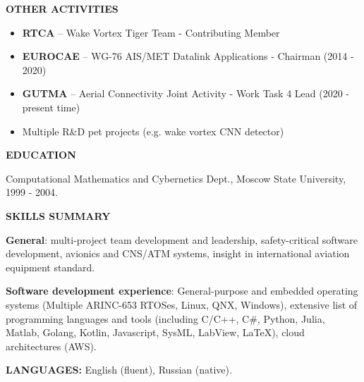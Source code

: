 \documentclass[a4paper]{article}
\begin{document}
    \textbf{OTHER ACTIVITIES}

	\begin{itemize}
	    \item \textbf{RTCA} -- Wake Vortex Tiger Team - Contributing Member
	    \item \textbf{EUROCAE} -- WG-76 AIS/MET Datalink Applications - Chairman (2014 - 2020)
	    \item \textbf{GUTMA} -- Aerial Connectivity Joint Activity - Work Task 4 Lead (2020 - present time)
	    \item Multiple R\&D pet projects (e.g. wake vortex CNN detector)
    \end{itemize}
    \vspace{3mm}
    
    \textbf{EDUCATION}
    \vspace{3mm}
    
    Computational Mathematics and Cybernetics Dept., Moscow State University, 1999 - 2004.
    \vspace{5mm}
    
    \textbf{SKILLS SUMMARY}
    \vspace{3mm}
    
    \textbf{General}: multi-project team development and leadership, safety-critical software development, avionics and CNS/ATM systems, insight in international aviation equipment standard.
    \vspace{3mm}
    
    \textbf{Software development experience}: General-purpose and embedded operating systems (Multiple ARINC-653 RTOSes, Linux, QNX, Windows), extensive list of programming languages and tools (including C/C++, C\#, Python, Julia, Matlab, Golang, Kotlin, Javascript, SysML, LabView, LaTeX), cloud architectures (AWS).
    \vspace{5mm}
    
    \textbf{LANGUAGES:} English (fluent), Russian (native).
\end{document}
